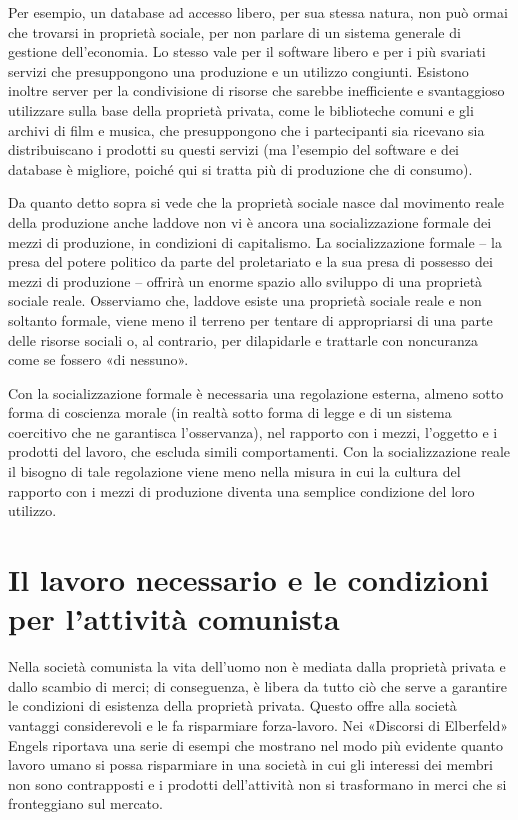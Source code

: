 \documentclass[12pt,a4paper,openany]{book}
\begin{document}
Per esempio, un database ad accesso libero, per sua stessa natura, non può ormai che trovarsi in proprietà sociale, per non parlare di un sistema generale di gestione dell'economia. Lo stesso vale per il software libero e per i più svariati servizi che presuppongono una produzione e un utilizzo congiunti. Esistono inoltre server per la condivisione di risorse che sarebbe inefficiente e svantaggioso utilizzare sulla base della proprietà privata, come le biblioteche comuni e gli archivi di film e musica, che presuppongono che i partecipanti sia ricevano sia distribuiscano i prodotti su questi servizi (ma l'esempio del software e dei database è migliore, poiché qui si tratta più di produzione che di consumo).

Da quanto detto sopra si vede che la proprietà sociale nasce dal movimento reale della produzione anche laddove non vi è ancora una socializzazione formale dei mezzi di produzione, in condizioni di capitalismo. La socializzazione formale – la presa del potere politico da parte del proletariato e la sua presa di possesso dei mezzi di produzione – offrirà un enorme spazio allo sviluppo di una proprietà sociale reale. Osserviamo che, laddove esiste una proprietà sociale reale e non soltanto formale, viene meno il terreno per tentare di appropriarsi di una parte delle risorse sociali o, al contrario, per dilapidarle e trattarle con noncuranza come se fossero «di nessuno».

Con la socializzazione formale è necessaria una regolazione esterna, almeno sotto forma di coscienza morale (in realtà sotto forma di legge e di un sistema coercitivo che ne garantisca l'osservanza), nel rapporto con i mezzi, l'oggetto e i prodotti del lavoro, che escluda simili comportamenti. Con la socializzazione reale il bisogno di tale regolazione viene meno nella misura in cui la cultura del rapporto con i mezzi di produzione diventa una semplice condizione del loro utilizzo.
\ifSubfilesClassLoaded{\setcounter{page}{36}}{}
\section{Il lavoro necessario e le condizioni per l'attività comunista}
\label{sec:06_opera_necessaria}

Nella società comunista la vita dell'uomo non è mediata dalla proprietà privata e dallo scambio di merci; di conseguenza, è libera da tutto ciò che serve a garantire le condizioni di esistenza della proprietà privata. Questo offre alla società vantaggi considerevoli e le fa risparmiare forza-lavoro. Nei «Discorsi di Elberfeld» Engels riportava una serie di esempi che mostrano nel modo più evidente quanto lavoro umano si possa risparmiare in una società in cui gli interessi dei membri non sono contrapposti e i prodotti dell'attività non si trasformano in merci che si fronteggiano sul mercato.
\end{document}

